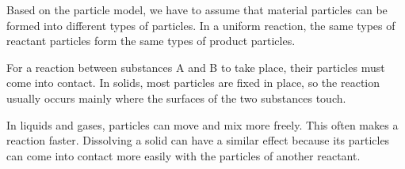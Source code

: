 \ResponseGap[200pt]


\ResponseGap[90pt]


\ResponseGap[90pt]

Based on the particle model, we have to assume that material particles can be formed into different types of particles. In a uniform reaction, the same types of reactant particles form the same types of product particles.


For a reaction between substances A and B to take place, their particles must come into contact. In solids, most particles are fixed in place, so the reaction usually occurs mainly where the surfaces of the two substances touch.


\begin{center}%
\resizebox{0.75\linewidth}{!}{\SolidSurfaceReactionFigure}\end{center}


In liquids and gases, particles can move and mix more freely. This often makes a reaction faster. Dissolving a solid can have a similar effect because its particles can come into contact more easily with the particles of another reactant.

